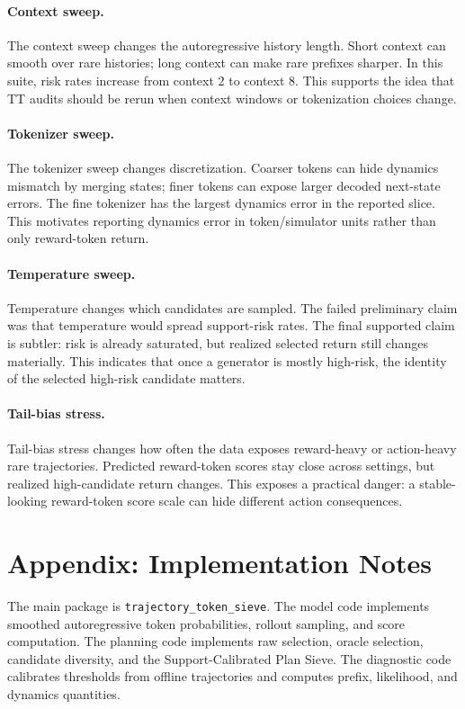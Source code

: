 \documentclass{article}
\newcommand{\method}{Support-Calibrated Plan Sieve}
\begin{document}
\paragraph{Context sweep.}
The context sweep changes the autoregressive history length. Short context can smooth over rare histories; long context can make rare prefixes sharper. In this suite, risk rates increase from context 2 to context 8. This supports the idea that TT audits should be rerun when context windows or tokenization choices change.

\paragraph{Tokenizer sweep.}
The tokenizer sweep changes discretization. Coarser tokens can hide dynamics mismatch by merging states; finer tokens can expose larger decoded next-state errors. The fine tokenizer has the largest dynamics error in the reported slice. This motivates reporting dynamics error in token/simulator units rather than only reward-token return.

\paragraph{Temperature sweep.}
Temperature changes which candidates are sampled. The failed preliminary claim was that temperature would spread support-risk rates. The final supported claim is subtler: risk is already saturated, but realized selected return still changes materially. This indicates that once a generator is mostly high-risk, the identity of the selected high-risk candidate matters.

\paragraph{Tail-bias stress.}
Tail-bias stress changes how often the data exposes reward-heavy or action-heavy rare trajectories. Predicted reward-token scores stay close across settings, but realized high-candidate return changes. This exposes a practical danger: a stable-looking reward-token score scale can hide different action consequences.

\section{Appendix: Implementation Notes}

The main package is \texttt{trajectory\_token\_sieve}. The model code implements smoothed autoregressive token probabilities, rollout sampling, and score computation. The planning code implements raw selection, oracle selection, candidate diversity, and the \method{}. The diagnostic code calibrates thresholds from offline trajectories and computes prefix, likelihood, and dynamics quantities.
\end{document}
